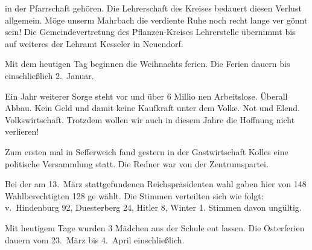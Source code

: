 

in der Pfarrschaft gehören. Die Lehrerschaft des Kreises\ob
bedauert diesen Verlust allgemein. Möge unserm\ob
Mahrbach die verdiente Ruhe noch recht lange ver\ohb
gönnt sein! Die Gemeindevertretung des\unsicher{} Pflanzen\unsicher-Kreises\ob
\unsicher Lehrerstelle übernimmt bis auf weiteres der\ob
Lehramt Kesseler in Neuendorf\unsicher.

%
 Mit dem heutigen Tag beginnen die Weihnachts\ohb
ferien. Die Ferien dauern bis einschließlich 2.\ Januar.

\pend
{}
\pstart

Ein Jahr weiterer Sorge steht vor und über 6 Millio\ohb
nen Arbeitslose. Überall Abbau. Kein Geld und\ob
damit keine Kaufkraft unter dem Volke. Not\ob
und Elend. Volkswirtschaft. Trotzdem wollen wir auch\ob
in diesem Jahre die Hoffnung nicht verlieren!

%
Zum ersten mal in Sefferweich fand gestern in\ob
der Gastwirtschaft Kolles eine politische Versammlung\ob
statt. Die Redner war von der Zentrumspartei.

%
Bei der am 13.\ März stattgefundenen Reichspräsidenten\ohb
wahl gaben hier von 148 Wahlberechtigten 128 ge\ohb
wählt. Die Stimmen verteilten sich wie folgt:\ob
v.\ Hindenburg 92, Duesterberg 24, Hitler 8, Winter 1. Stimmen davon ungültig.

%
Mit heutigem Tage wurden 3 Mädchen aus der Schule ent\ohb
lassen. Die Osterferien dauern vom 23.\ März\ob
bis 4.\ April einschließlich.
\pend
